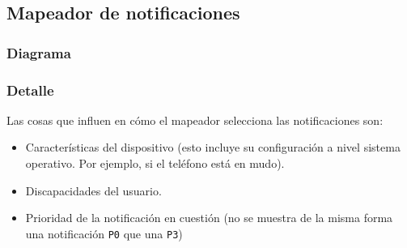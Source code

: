 \subsection{Mapeador de notificaciones}
\subsubsection{Diagrama}


\subsubsection{Detalle}
Las cosas que influen en cómo el mapeador selecciona las notificaciones son:
\begin{itemize}
	\item Características del dispositivo (esto incluye su configuración a nivel sistema operativo. Por ejemplo, si el teléfono está en mudo).
	\item Discapacidades del usuario.
	\item Prioridad de la notificación en cuestión (no se muestra de la misma forma una notificación \texttt{P0} que una \texttt{P3})
\end{itemize}